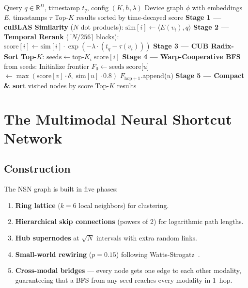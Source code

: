 \documentclass[11pt]{article}
\newcommand{\mars}{\textsc{Mars}}
\begin{document}
\begin{algorithm}[t]
\caption{\mars{} GPU-Resident Retrieval Pipeline}
\label{alg:pipeline}
\begin{algorithmic}[1]
\REQUIRE Query $q \in \mathbb{R}^D$, timestamp $t_q$, config $(K, h, \lambda)$
\REQUIRE Device graph $\phi$ with embeddings $E$, timestamps $\tau$
\ENSURE Top-$K$ results sorted by time-decayed score
\STATE \textbf{Stage 1 --- cuBLAS Similarity} ($N$ dot products):
    \STATE $\text{sim}[i] \leftarrow \langle E(v_i), q \rangle$
\ENDFOR
\STATE \textbf{Stage 2 --- Temporal Rerank} ($\lceil N/256 \rceil$ blocks):
    \STATE $\text{score}[i] \leftarrow \text{sim}[i] \cdot \exp(-\lambda \cdot (t_q - \tau(v_i)))$
\ENDFOR
\STATE \textbf{Stage 3 --- CUB Radix-Sort Top-$K$}:
\STATE $\text{seeds} \leftarrow \text{top-}K_{i} \; \text{score}[i]$
\STATE \textbf{Stage 4 --- Warp-Cooperative BFS} from seeds:
\STATE Initialize frontier $F_0 \leftarrow \text{seeds}$
                \STATE score[$u$] $\leftarrow \max(\text{score}[v] \cdot \delta,\; \text{sim}[u] \cdot 0.8)$
                \STATE $F_{\text{hop}+1}$.append($u$)
            \ENDIF
        \ENDFOR
    \ENDFOR
\ENDFOR
\STATE \textbf{Stage 5 --- Compact \& sort} visited nodes by score
\RETURN Top-$K$ results
\end{algorithmic}
\end{algorithm}

\section{The Multimodal Neural Shortcut Network}
\label{sec:nsn}

\subsection{Construction}

The NSN graph is built in five phases:

\begin{enumerate}
\item \textbf{Ring lattice} ($k{=}6$ local neighbors) for clustering.
\item \textbf{Hierarchical skip connections} (powers of 2) for
  logarithmic path lengths.
\item \textbf{Hub supernodes} at $\sqrt{N}$ intervals with extra random
  links.
\item \textbf{Small-world rewiring} ($p{=}0.15$) following
  Watts-Strogatz~\cite{wattsstrogatz}.
\item \textbf{Cross-modal bridges} --- every node gets one edge to each
  other modality, guaranteeing that a BFS from any seed reaches every
  modality in 1~hop.
\end{enumerate}
\end{document}
